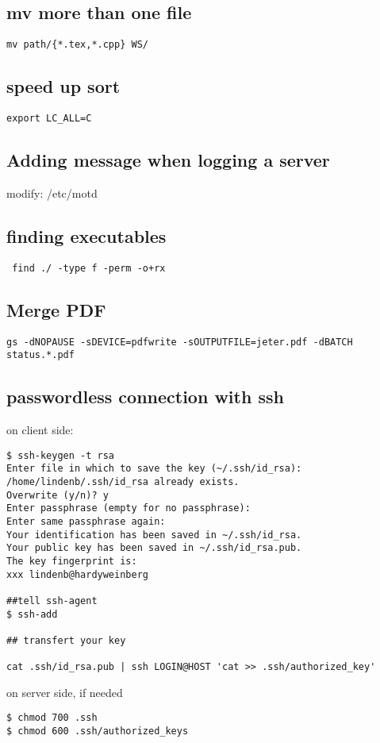 \documentclass[12pt]{article}
\begin{document}
\subsection{mv more than one file}
\begin{lstlisting}
mv path/{*.tex,*.cpp} WS/
\end{lstlisting}

\subsection{speed up sort}
\begin{lstlisting}
export LC_ALL=C
\end{lstlisting}

\subsection{Adding message when logging a server}
modify: /etc/motd
\subsection{finding executables}
\begin{lstlisting}
 find ./ -type f -perm -o+rx
\end{lstlisting}

\subsection{Merge PDF}
\begin{lstlisting}
gs -dNOPAUSE -sDEVICE=pdfwrite -sOUTPUTFILE=jeter.pdf -dBATCH status.*.pdf
\end{lstlisting}

\subsection{passwordless connection with ssh}
on client side:
\begin{lstlisting}
$ ssh-keygen -t rsa
Enter file in which to save the key (~/.ssh/id_rsa): 
/home/lindenb/.ssh/id_rsa already exists.
Overwrite (y/n)? y
Enter passphrase (empty for no passphrase): 
Enter same passphrase again: 
Your identification has been saved in ~/.ssh/id_rsa.
Your public key has been saved in ~/.ssh/id_rsa.pub.
The key fingerprint is:
xxx lindenb@hardyweinberg

##tell ssh-agent
$ ssh-add

## transfert your key

cat .ssh/id_rsa.pub | ssh LOGIN@HOST 'cat >> .ssh/authorized_key'

\end{lstlisting}
on server side, if needed
\begin{lstlisting}
$ chmod 700 .ssh
$ chmod 600 .ssh/authorized_keys
\end{lstlisting}
\end{document}
